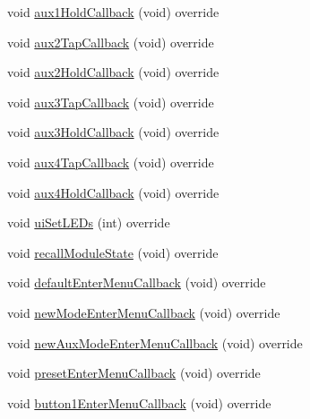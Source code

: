 \begin{DoxyCompactItemize}
\item 
void \mbox{\hyperlink{class_via_scanner_1_1_via_scanner_u_i_a634c06fae2a1a17e5f3737dd44b34e10}{aux1\+Hold\+Callback}} (void) override
\item 
void \mbox{\hyperlink{class_via_scanner_1_1_via_scanner_u_i_a7d3aad2399479925618df242bc5b1f42}{aux2\+Tap\+Callback}} (void) override
\item 
void \mbox{\hyperlink{class_via_scanner_1_1_via_scanner_u_i_a929ba662a65fd62f9c5b122accad48a4}{aux2\+Hold\+Callback}} (void) override
\item 
void \mbox{\hyperlink{class_via_scanner_1_1_via_scanner_u_i_a7d15083a3565f56b4b70ac497fddd563}{aux3\+Tap\+Callback}} (void) override
\item 
void \mbox{\hyperlink{class_via_scanner_1_1_via_scanner_u_i_ac79b09eb94d39065b6b5061d34746862}{aux3\+Hold\+Callback}} (void) override
\item 
void \mbox{\hyperlink{class_via_scanner_1_1_via_scanner_u_i_a8c20c03c838257da356f0071dfcbfd36}{aux4\+Tap\+Callback}} (void) override
\item 
void \mbox{\hyperlink{class_via_scanner_1_1_via_scanner_u_i_af994cf63aa7becc41c9e3dcb2e08d8c2}{aux4\+Hold\+Callback}} (void) override
\item 
void \mbox{\hyperlink{class_via_scanner_1_1_via_scanner_u_i_aa2c3ca7904d9036eb362c7600dac66b0}{ui\+Set\+L\+E\+Ds}} (int) override
\item 
void \mbox{\hyperlink{class_via_scanner_1_1_via_scanner_u_i_a9513c8ecc955ccfbdaebea4172deb210}{recall\+Module\+State}} (void) override
\item 
void \mbox{\hyperlink{class_via_scanner_1_1_via_scanner_u_i_adc8f206d1050c457af29a45cf8050faf}{default\+Enter\+Menu\+Callback}} (void) override
\item 
void \mbox{\hyperlink{class_via_scanner_1_1_via_scanner_u_i_a15124d20f2684fd9c5d1c83d41a15e5a}{new\+Mode\+Enter\+Menu\+Callback}} (void) override
\item 
void \mbox{\hyperlink{class_via_scanner_1_1_via_scanner_u_i_a8176484cc1deb6df08abfe1f0c1f789f}{new\+Aux\+Mode\+Enter\+Menu\+Callback}} (void) override
\item 
void \mbox{\hyperlink{class_via_scanner_1_1_via_scanner_u_i_ac67240d1c9ebc47569185776d9d4403b}{preset\+Enter\+Menu\+Callback}} (void) override
\item 
void \mbox{\hyperlink{class_via_scanner_1_1_via_scanner_u_i_a10b9a54f4fb6ea88203d53041093d650}{button1\+Enter\+Menu\+Callback}} (void) override
\item 

\end{DoxyCompactItemize}
